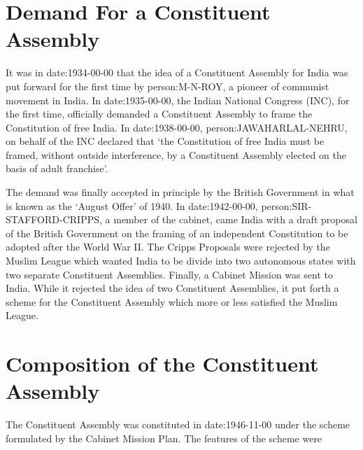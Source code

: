 \section{Demand For a Constituent Assembly}

It was in \gls{date:1934-00-00} that the idea of a Constituent Assembly for India was put forward for the first time by \gls{person:M-N-ROY}, a pioneer of communist movement in India. In \gls{date:1935-00-00}, the Indian National Congress (INC), for the first time, officially demanded a Constituent Assembly to frame the Constitution of free India. In \gls{date:1938-00-00}, \gls{person:JAWAHARLAL-NEHRU}, on behalf of the INC declared that `the Constitution of free India must be framed, without outside interference, by a Constituent Assembly elected on the basis of adult franchise'.

The demand was finally accepted in principle by the British Government in what is known as the `August Offer' of 1940. In \gls{date:1942-00-00}, \gls{person:SIR-STAFFORD-CRIPPS}, a member of the cabinet, came India with a draft proposal of the British Government on the framing of an independent Constitution to be adopted after the World War II. The Cripps Proposals were rejected by the Muslim League which wanted India to be divide into two autonomous states with two separate Constituent Assemblies. Finally, a Cabinet Mission was sent to India. While it rejected the idea of two Constituent Assemblies, it put forth a scheme for the Constituent Assembly which more or less satisfied the Muslim League.

\section{Composition of the Constituent Assembly}

The Constituent Assembly was constituted in \gls{date:1946-11-00} under the scheme formulated by the Cabinet Mission Plan. The features of the scheme were

